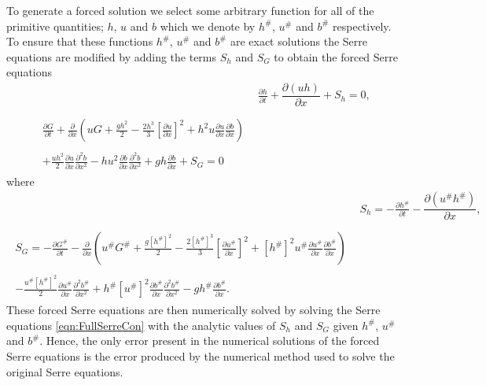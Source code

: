 \documentclass[AMA,STIX1COL]{WileyNJD-v2}
\begin{document}
To generate a forced solution we select some arbitrary function for all of the primitive quantities; $h$, $u$ and $b$ which we denote by $h^\#$, $u^\#$ and $b^\#$ respectively. To ensure that these functions $h^\#$, $u^\#$ and $b^\#$ are exact solutions the Serre equations are modified by adding the terms $S_{h} $ and $S_{G}$ to obtain the forced Serre equations
\begin{align*}
& \frac{\partial h}{\partial t} + \dfrac{\partial (uh)}{\partial x} + S_{h}  = 0 ,  \\ \nonumber \\
\begin{split}
\frac{\partial G}{\partial t}  + \frac{\partial}{\partial x} \left( {u} G + \frac{gh^2}{2} - \frac{2h^3}{3} \left[ \frac{\partial {u}}{\partial x} \right]^2 + h^2 {u}\frac{\partial {u}}{\partial x}\frac{\partial b}{\partial x} \right) \\ \\ + \frac{uh^2 }{2}\frac{\partial {u}}{\partial x} \frac{\partial^2 b}{\partial x^2}  - h {u}^2\frac{\partial b}{\partial x}\frac{\partial^2 b}{\partial x^2} + gh\frac{\partial b}{\partial x} + S_{G} = 0
\end{split}
\end{align*}
where
\begin{align*}
&  S_{h} = -\frac{\partial h^\#}{\partial t} - \dfrac{\partial (u^\#h^\#)}{\partial x} ,  \\ \nonumber \\
\begin{split}
S_{G} = -\frac{\partial G^\#}{\partial t}  - \frac{\partial}{\partial x} \left( {u}^\# G^\# + \frac{g\left[h^\#\right]^2}{2} - \frac{2\left[h^\#\right]^3}{3} \left[\frac{\partial {u}^\#}{\partial x}\right]^2 + \left[h^\#\right]^2 {u^\#}\frac{\partial {u}^\#}{\partial x}\frac{\partial b^\#}{\partial x} \right) \\ \\ - \frac{{u}^\#\left[h^\#\right]^2 }{2} \frac{\partial {u}^\#}{\partial x} \frac{\partial^2 b^\#}{\partial x^2}  + h^\# {\left[u^\#\right]}^2\frac{\partial b^\#}{\partial x}\frac{\partial^2 b^\#}{\partial x^2} - gh^\#\frac{\partial b^\#}{\partial x}.
\end{split}
\end{align*} 
These forced Serre equations are then numerically solved by solving the Serre equations \eqref{eqn:FullSerreCon} with the analytic values of $S_{h}$ and $S_{G}$ given $h^\#$, $u^\#$ and $b^\#$. Hence, the only error present in the numerical solutions of the forced Serre equations is the error produced by the numerical method used to solve the original Serre equations.
\end{document}
